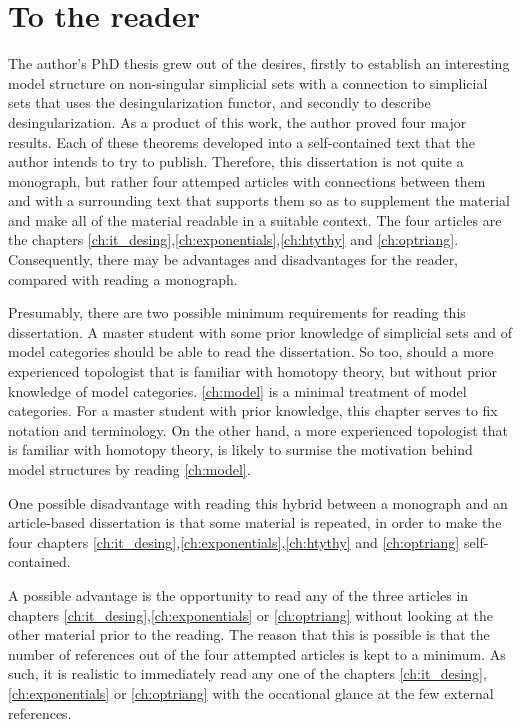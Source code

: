 
\chapter{To the reader}

The author’s PhD thesis grew out of the desires, firstly to establish an interesting model structure on non-singular simplicial sets with a connection to simplicial sets that uses the desingularization functor, and secondly to describe desingularization. As a product of this work, the author proved four major results. Each of these theorems developed into a self-contained text that the author intends to try to publish. Therefore, this dissertation is not quite a monograph, but rather four attemped articles with connections between them and with a surrounding text that supports them so as to supplement the material and make all of the material readable in a suitable context. The four articles are the chapters \ref{ch:it_desing},\ref{ch:exponentials},\ref{ch:htythy} and \ref{ch:optriang}. Consequently, there may be advantages and disadvantages for the reader, compared with reading a monograph. 

Presumably, there are two possible minimum requirements for reading this dissertation. A master student with some prior knowledge of simplicial sets and of model categories should be able to read the dissertation. So too, should a more experienced topologist that is familiar with homotopy theory, but without prior knowledge of model categories. \cref{ch:model} is a minimal treatment of model categories. For a master student with prior knowledge, this chapter serves to fix notation and terminology. On the other hand, a more experienced topologist that is familiar with homotopy theory, is likely to surmise the motivation behind model structures by reading \cref{ch:model}. 

One possible disadvantage with reading this hybrid between a monograph and an article-based dissertation is that some material is repeated, in order to make the four chapters \ref{ch:it_desing},\ref{ch:exponentials},\ref{ch:htythy} and \ref{ch:optriang} self-contained. 

A possible advantage is the opportunity to read any of the three articles in chapters \ref{ch:it_desing},\ref{ch:exponentials} or \ref{ch:optriang} without looking at the other material prior to the reading. The reason that this is possible is that the number of references out of the four attempted articles is kept to a minimum. As such, it is realistic to immediately read any one of the chapters \ref{ch:it_desing},\ref{ch:exponentials} or \ref{ch:optriang} with the occational glance at the few external references.

